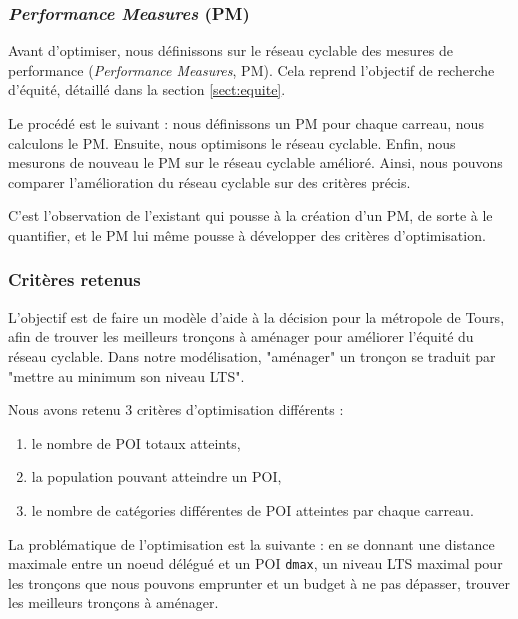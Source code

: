 \subsubsection{\emph{Performance Measures} (PM)}

Avant d'optimiser, nous définissons sur le réseau cyclable des mesures de performance (\emph{Performance Measures}, PM). Cela reprend l'objectif de recherche d'équité, détaillé dans la section \ref{sect:equite}. 

Le procédé est le suivant : nous définissons un PM pour chaque carreau, nous calculons le PM. Ensuite, nous optimisons le réseau cyclable. Enfin, nous mesurons de nouveau le PM sur le réseau cyclable amélioré. Ainsi, nous pouvons comparer l'amélioration du réseau cyclable sur des critères précis.

C'est l'observation de l'existant qui pousse à la création d'un PM, de sorte à le quantifier, et le PM lui même pousse à développer des critères d'optimisation.




\subsubsection{Critères retenus}


L'objectif est de faire un modèle d'aide à la décision pour la métropole de Tours, afin de trouver les meilleurs tronçons à aménager pour améliorer l'équité du réseau cyclable. Dans notre modélisation, "aménager" un tronçon se traduit par "mettre au minimum son niveau LTS".

Nous avons retenu 3 critères d'optimisation différents :

\begin{enumerate} \label{criteresopti}
    \item le nombre de POI totaux atteints, \label{criterepoi}
    \item la population pouvant atteindre un POI, \label{criterepopu}
    \item le nombre de catégories différentes de POI atteintes par chaque carreau. \label{criterecat}
\end{enumerate}

La problématique de l'optimisation est la suivante : en se donnant une distance maximale entre un noeud délégué et un POI \texttt{dmax}, un niveau LTS maximal pour les tronçons que nous pouvons emprunter et un budget à ne pas dépasser, trouver les meilleurs tronçons à aménager.

